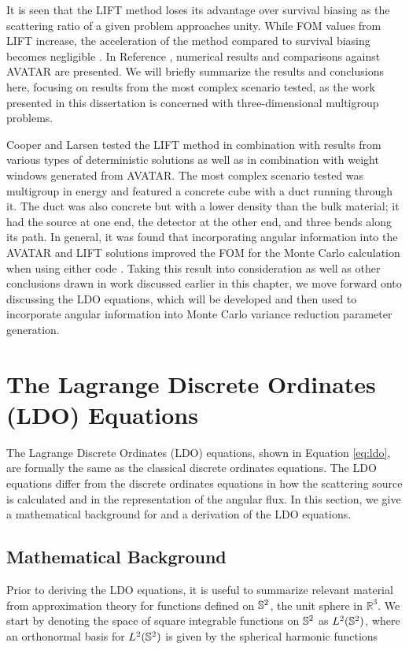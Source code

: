 It is seen that the LIFT method loses its advantage over survival biasing as the 
scattering ratio of a given problem approaches unity. While FOM values from LIFT
increase, the acceleration of the method compared to survival biasing becomes 
negligible \cite{lift1}. In Reference \cite{lift2}, numerical results and comparisons 
against
AVATAR are presented. We will briefly summarize the results and conclusions here,
focusing on results from the most complex scenario tested, as the work presented in 
this dissertation is concerned with three-dimensional multigroup problems.

Cooper and Larsen tested the LIFT method in combination with results from various
types of deterministic solutions as well as in combination with weight windows
generated from AVATAR. The most complex scenario tested was multigroup in energy 
and featured a concrete cube with a duct running through it. The duct was also
concrete but with a lower density than the bulk material; it had the source at one end,
the detector at the other end, and three bends along its path. In general, it was
found that incorporating angular information into the AVATAR and LIFT solutions 
improved the FOM for the Monte Carlo calculation when using either code \cite{lift2}.
Taking this result into consideration as well as other conclusions drawn in work 
discussed earlier in this chapter, we move forward onto discussing the LDO equations,
which will be developed and then used to incorporate angular information into Monte
Carlo variance reduction parameter generation.

\section{The Lagrange Discrete Ordinates (LDO) Equations}
\label{sec:ldo}

The Lagrange Discrete Ordinates (LDO) equations, shown in Equation \ref{eq:ldo}, are
formally the same as the classical discrete ordinates equations. The LDO equations
differ from the discrete ordinates equations in how the scattering source is 
calculated and in the representation of the angular flux. In this section, we give a
mathematical background for and a derivation of the LDO equations.

\subsection{Mathematical Background}
\label{sec:ldo_math}

Prior to deriving the LDO equations, it is useful to summarize relevant material from
approximation theory for functions defined on $\mathbb{S}^2$, the unit sphere in 
$\mathbb{R}^3$. We start by denoting the space of square integrable functions on
$\mathbb{S}^2$ as $L^2(\mathbb{S}^2)$, where an orthonormal basis for $L^2(\mathbb{S}^2)$ is given by 
the spherical harmonic functions

